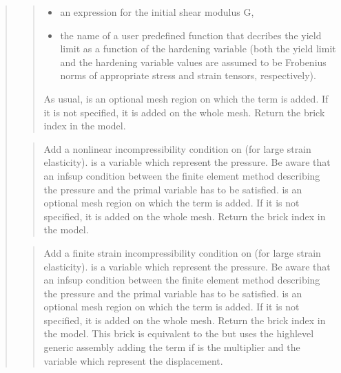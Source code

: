 \documentclass[a4paper,11pt,english]{sphinxmanual}
\begin{document}
\begin{quote}
\begin{quote}
\begin{itemize}
\item {} 
\sphinxAtStartPar
an expression for the initial shear modulus G,

\item {} 
\sphinxAtStartPar
the name of a user predefined function that decribes
the yield limit as a function of the hardening variable
(both the yield limit and the hardening variable values are
assumed to be Frobenius norms of appropriate stress and strain
tensors, respectively).

\end{itemize}

\sphinxAtStartPar
As usual,  is an optional mesh region on which the term is added.
If it is not specified, it is added on the whole mesh.
Return the brick index in the model.
\end{quote}

\sphinxAtStartPar
{}
\begin{quote}

\sphinxAtStartPar
Add a nonlinear incompressibility condition on  (for large
strain elasticity). 
is a variable which represent the pressure. Be aware that an inf\sphinxhyphen{}sup
condition between the finite element method describing the pressure and the
primal variable has to be satisfied.  is an optional mesh region on
which the term is added. If it is not specified, it is added on the
whole mesh. Return the brick index in the model.
\end{quote}

\sphinxAtStartPar
{}
\begin{quote}

\sphinxAtStartPar
Add a finite strain incompressibility condition on  (for large
strain elasticity). 
is a variable which represent the pressure. Be aware that an inf\sphinxhyphen{}sup
condition between the finite element method describing the pressure and the
primal variable has to be satisfied.  is an optional mesh region on
which the term is added. If it is not specified, it is added on the
whole mesh. Return the brick index in the model.
This brick is equivalent to the  but
uses the high\sphinxhyphen{}level generic assembly adding the term
 if  is the multiplier and
 the variable which represent the displacement.
\end{quote}


\end{quote}
\end{document}
